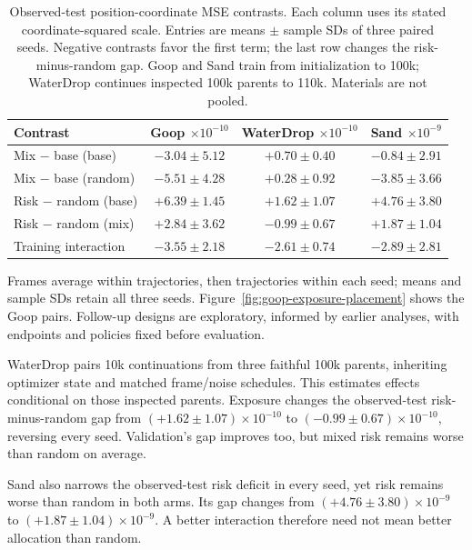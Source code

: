\begin{table}[t]
\centering\scriptsize
\caption{Observed-test position-coordinate MSE contrasts. Each column uses its stated coordinate-squared scale. Entries are means $\pm$ sample SDs of three paired seeds. Negative contrasts favor the first term; the last row changes the risk-minus-random gap. Goop and Sand train from initialization to 100k; WaterDrop continues inspected 100k parents to 110k. Materials are not pooled.}
\label{tab:goop-exposure-placement}
\setlength{\tabcolsep}{2pt}
\begin{tabular}{lccc}
\toprule
Contrast & \shortstack{Goop\\$\times10^{-10}$} & \shortstack{WaterDrop\\$\times10^{-10}$} & \shortstack{Sand\\$\times10^{-9}$}\\
\midrule
Mix $-$ base (base) & $-3.04\pm5.12$ & $+0.70\pm0.40$ & $-0.84\pm2.91$\\
Mix $-$ base (random) & $-5.51\pm4.28$ & $+0.28\pm0.92$ & $-3.85\pm3.66$\\
Risk $-$ random (base) & $+6.39\pm1.45$ & $+1.62\pm1.07$ & $+4.76\pm3.80$\\
Risk $-$ random (mix) & $+2.84\pm3.62$ & $-0.99\pm0.67$ & $+1.87\pm1.04$\\
Training interaction & $-3.55\pm2.18$ & $-2.61\pm0.74$ & $-2.89\pm2.81$\\
\bottomrule
\end{tabular}
\end{table}

Frames average within trajectories, then trajectories within each seed; means and sample SDs retain all three seeds. Figure~\ref{fig:goop-exposure-placement} shows the Goop pairs. Follow-up designs are exploratory, informed by earlier analyses, with endpoints and policies fixed before evaluation.

WaterDrop pairs 10k continuations from three faithful 100k parents, inheriting optimizer state and matched frame/noise schedules. This estimates effects conditional on those inspected parents. Exposure changes the observed-test risk-minus-random gap from $(+1.62\pm1.07)\times10^{-10}$ to $(-0.99\pm0.67)\times10^{-10}$, reversing every seed. Validation's gap improves too, but mixed risk remains worse than random on average.

Sand also narrows the observed-test risk deficit in every seed, yet risk remains worse than random in both arms. Its gap changes from $(+4.76\pm3.80)\times10^{-9}$ to $(+1.87\pm1.04)\times10^{-9}$. A better interaction therefore need not mean better allocation than random.

